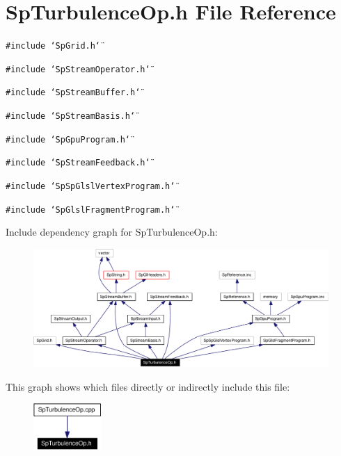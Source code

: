 \section{Sp\-Turbulence\-Op.h File Reference}
\label{SpTurbulenceOp_8h}
{\tt \#include \char`\"{}Sp\-Grid.h\char`\"{}}\par
{\tt \#include \char`\"{}Sp\-Stream\-Operator.h\char`\"{}}\par
{\tt \#include \char`\"{}Sp\-Stream\-Buffer.h\char`\"{}}\par
{\tt \#include \char`\"{}Sp\-Stream\-Basis.h\char`\"{}}\par
{\tt \#include \char`\"{}Sp\-Gpu\-Program.h\char`\"{}}\par
{\tt \#include \char`\"{}Sp\-Stream\-Feedback.h\char`\"{}}\par
{\tt \#include \char`\"{}Sp\-Sp\-Glsl\-Vertex\-Program.h\char`\"{}}\par
{\tt \#include \char`\"{}Sp\-Glsl\-Fragment\-Program.h\char`\"{}}\par


Include dependency graph for Sp\-Turbulence\-Op.h:\begin{figure}[H]
\begin{center}
\leavevmode
\includegraphics[width=393pt]{SpTurbulenceOp_8h__incl}
\end{center}
\end{figure}


This graph shows which files directly or indirectly include this file:\begin{figure}[H]
\begin{center}
\leavevmode
\includegraphics[width=73pt]{SpTurbulenceOp_8h__dep__incl}
\end{center}
\end{figure}
